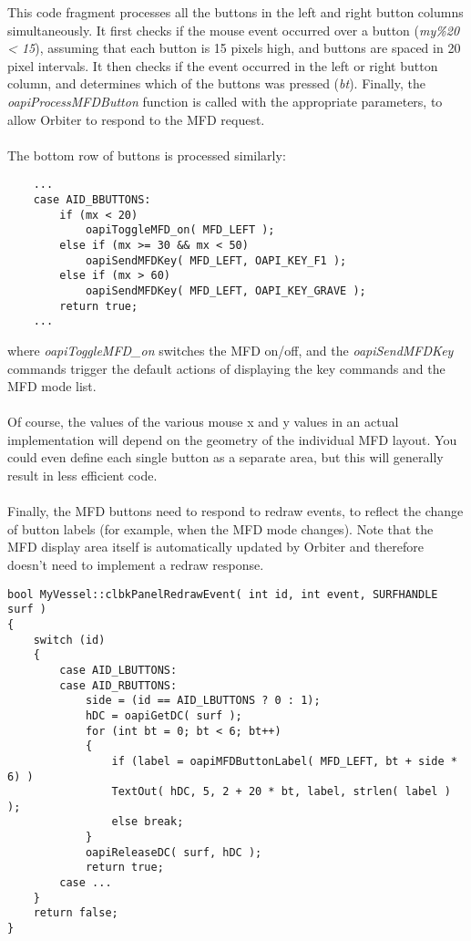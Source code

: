 \documentclass[Orbiter Developer Manual.tex]{subfiles}
\begin{document}
\noindent
This code fragment processes all the buttons in the left and right button columns simultaneously. It first checks if the mouse event occurred over a button (\textit{my\%20 < 15}), assuming that each button is 15 pixels high, and buttons are spaced in 20 pixel intervals. It then checks if the event occurred in the left or right button column, and determines which of the buttons was pressed (\textit{bt}). Finally, the \textit{oapiProcessMFDButton} function is called with the appropriate parameters, to allow Orbiter to respond to the MFD request.\\
\\
The bottom row of buttons is processed similarly:

\begin{lstlisting}
	...
	case AID_BBUTTONS:
		if (mx < 20)
			oapiToggleMFD_on( MFD_LEFT );
		else if (mx >= 30 && mx < 50)
			oapiSendMFDKey( MFD_LEFT, OAPI_KEY_F1 );
		else if (mx > 60)
			oapiSendMFDKey( MFD_LEFT, OAPI_KEY_GRAVE );
		return true;
	...
\end{lstlisting}

\noindent
where \textit{oapiToggleMFD\_on} switches the MFD on/off, and the \textit{oapiSendMFDKey} commands trigger the default actions of displaying the key commands and the MFD mode list.\\
\\
Of course, the values of the various mouse x and y values in an actual implementation will depend on the geometry of the individual MFD layout. You could even define each single button as a separate area, but this will generally result in less efficient code.\\
\\
Finally, the MFD buttons need to respond to redraw events, to reflect the change of button labels (for example, when the MFD mode changes). Note that the MFD display area itself is automatically updated by Orbiter and therefore doesn't need to implement a redraw response.

\begin{lstlisting}
bool MyVessel::clbkPanelRedrawEvent( int id, int event, SURFHANDLE surf )
{
	switch (id)
	{
		case AID_LBUTTONS:
		case AID_RBUTTONS:
			side = (id == AID_LBUTTONS ? 0 : 1);
			hDC = oapiGetDC( surf );
			for (int bt = 0; bt < 6; bt++)
			{
				if (label = oapiMFDButtonLabel( MFD_LEFT, bt + side * 6) )
				TextOut( hDC, 5, 2 + 20 * bt, label, strlen( label ) );
				else break;
			}
			oapiReleaseDC( surf, hDC );
			return true;
		case ...
	}
	return false;
}
\end{lstlisting}
\end{document}
